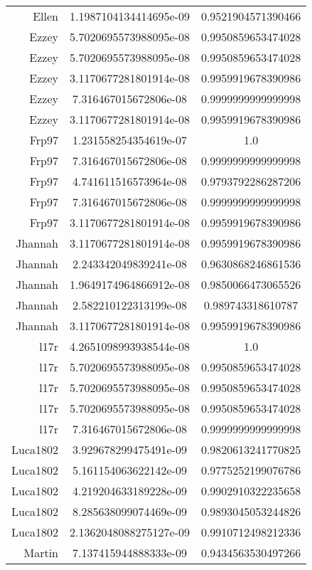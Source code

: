 \begin{tabular}{r c c}
    Ellen & 1.1987104134414695e-09 & 0.9521904571390466 \\
    Ezzey & 5.7020695573988095e-08 & 0.9950859653474028 \\
    Ezzey & 5.7020695573988095e-08 & 0.9950859653474028 \\
    Ezzey & 3.1170677281801914e-08 & 0.9959919678390986 \\
    Ezzey & 7.316467015672806e-08 & 0.9999999999999998 \\
    Ezzey & 3.1170677281801914e-08 & 0.9959919678390986 \\
    Frp97 & 1.231558254354619e-07 & 1.0 \\
    Frp97 & 7.316467015672806e-08 & 0.9999999999999998 \\
    Frp97 & 4.741611516573964e-08 & 0.9793792286287206 \\
    Frp97 & 7.316467015672806e-08 & 0.9999999999999998 \\
    Frp97 & 3.1170677281801914e-08 & 0.9959919678390986 \\
    Jhannah & 3.1170677281801914e-08 & 0.9959919678390986 \\
    Jhannah & 2.243342049839241e-08 & 0.9630868246861536 \\
    Jhannah & 1.9649174964866912e-08 & 0.9850066473065526 \\
    Jhannah & 2.582210122313199e-08 & 0.989743318610787 \\
    Jhannah & 3.1170677281801914e-08 & 0.9959919678390986 \\
    l17r & 4.2651098993938544e-08 & 1.0 \\
    l17r & 5.7020695573988095e-08 & 0.9950859653474028 \\
    l17r & 5.7020695573988095e-08 & 0.9950859653474028 \\
    l17r & 5.7020695573988095e-08 & 0.9950859653474028 \\
    l17r & 7.316467015672806e-08 & 0.9999999999999998 \\
    Luca1802 & 3.929678299475491e-09 & 0.9820613241770825 \\
    Luca1802 & 5.161154063622142e-09 & 0.9775252199076786 \\
    Luca1802 & 4.219204633189228e-09 & 0.9902910322235658 \\
    Luca1802 & 8.285638099074469e-09 & 0.9893045053244826 \\
    Luca1802 & 2.1362048088275127e-09 & 0.9910712498212336 \\
    Martin & 7.137415944888333e-09 & 0.9434563530497266 \\

\end{tabular}
